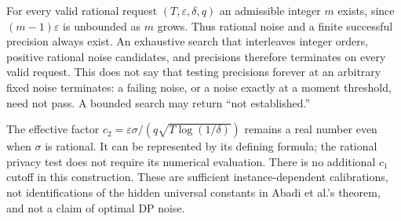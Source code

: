 \documentclass[11pt]{article}
\begin{document}
For every valid rational request $(T,\varepsilon,\delta,q)$ an admissible
integer $m$ exists, since $(m-1)\varepsilon$ is unbounded as $m$ grows.
Thus rational noise and a finite successful precision always exist.
An exhaustive search that interleaves integer orders, positive rational
noise candidates, and precisions therefore terminates on every valid request.
This does not say that testing precisions forever at an arbitrary fixed
noise terminates: a failing noise, or a noise exactly at a moment threshold,
need not pass. A bounded search may return ``not established.''

The effective factor $c_2=\varepsilon\sigma/
(q\sqrt{T\log(1/\delta)})$ remains a real number even when $\sigma$ is
rational. It can be represented by its defining formula; the rational
privacy test does not require its numerical evaluation. There is no
additional $c_1$ cutoff in this construction. These are sufficient
instance-dependent calibrations, not identifications of the hidden universal
constants in Abadi et al.'s theorem, and not a claim of optimal DP noise.
\end{document}
